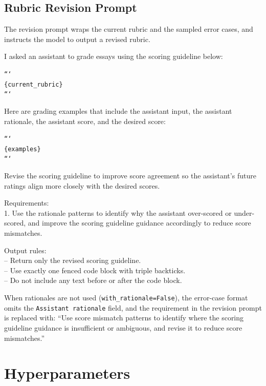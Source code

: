 \documentclass[11pt]{article}
\begin{document}
\subsection{Rubric Revision Prompt}
\label{sec:revision_prompt}
The revision prompt wraps the current rubric and the sampled error cases, and instructs the model to output a revised rubric.

\begin{tcolorbox}[colback=white, colframe=RoyalBlue, title=Rubric Revision Prompt (with rationale), fonttitle=\bfseries\small, fontupper=\small, breakable]
I asked an assistant to grade essays using the scoring guideline below:

\texttt{```}\\
\texttt{\{current\_rubric\}}\\
\texttt{```}

Here are grading examples that include the assistant input, the assistant rationale, the assistant score, and the desired score:

\texttt{```}\\
\texttt{\{examples\}}\\
\texttt{```}

Revise the scoring guideline to improve score agreement so the assistant's future ratings align more closely with the desired scores.

Requirements:\\
1. Use the rationale patterns to identify why the assistant over-scored or under-scored, and improve the scoring guideline guidance accordingly to reduce score mismatches.

Output rules:\\
-- Return only the revised scoring guideline.\\
-- Use exactly one fenced code block with triple backticks.\\
-- Do not include any text before or after the code block.
\end{tcolorbox}

When rationales are not used (\texttt{with\_rationale=False}), the error-case format omits the \texttt{Assistant rationale} field, and the requirement in the revision prompt is replaced with: ``Use score mismatch patterns to identify where the scoring guideline guidance is insufficient or ambiguous, and revise it to reduce score mismatches.''

\section{Hyperparameters}
\label{sec:appendix_hparams}
\end{document}
